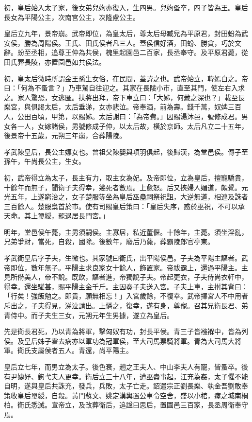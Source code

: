 \begin{pinyinscope}
初，皇后始入太子家，後女弟兒姁亦復入，生四男。兒姁蚤卒，四子皆為王。皇后長女為平陽公主，次南宮公主，次隆慮公主。

皇后立九年，景帝崩。武帝即位，為皇太后，尊太后母臧兒為平原君，封田蚡為武安侯，勝為周陽侯。王氏、田氏侯者凡三人。蓋侯信好酒，田蚡、勝貪，巧於文辭。蚡至丞相，追尊王仲為共侯，槐里起園邑二百家，長丞奉守。及平原君薨，從田氏葬長陵，亦置園邑如共侯法。

初，皇太后微時所謂金王孫生女俗，在民間，蓋諱之也。武帝始立，韓嫣白之。帝曰：「何為不蚤言？」乃車駕自往迎之。其家在長陵小市，直至其門，使左右入求之。家人驚恐，女逃匿。扶將出拜，帝下車立曰：「大姊，何藏之深也？」載至長樂宮，與俱謁太后，太后垂涕，女亦悲泣。帝奉酒，前為壽。錢千萬，奴婢三百人，公田百頃，甲第，以賜姊。太后謝曰：「為帝費。」因賜湯沐邑，號修成君。男女各一人，女嫁諸侯，男號修成子仲，以太后故，橫於京師。太后凡立二十五年，後景帝十五歲，元朔三年崩，合葬陽陵。

孝武陳皇后，長公主嫖女也。曾祖父陳嬰與項羽俱起，後歸漢，為堂邑侯。傳子至孫午，午尚長公主，生女。

初，武帝得立為太子，長主有力，取主女為妃。及帝即位，立為皇后，擅寵驕貴，十餘年而無子，聞衛子夫得幸，幾死者數焉。上愈怒。后又挾婦人媚道，頗覺。元光五年，上遂窮治之，女子楚服等坐為皇后巫蠱祠祭祝詛，大逆無道，相連及誅者三百餘人。楚服梟首於市。使有司賜皇后策曰：「皇后失序，惑於巫祝，不可以承天命。其上璽綬，罷退居長門宮。」

明年，堂邑侯午薨，主男須嗣侯。主寡居，私近董偃。十餘年，主薨。須坐淫亂，兄弟爭財，當死，自殺，國除。後數年，廢后乃薨，葬霸陵郎官亭東。

孝武衛皇后字子夫，生微也。其家號曰衛氏，出平陽侯邑。子夫為平陽主謳者。武帝即位，數年無子。平陽主求良家女十餘人，飾置家。帝祓霸上，還過平陽主。主見所偫美人，帝不說。既飲，謳者進，帝獨說子夫。帝起更衣，子夫侍尚衣軒中，得幸。還坐驩甚，賜平陽主金千斤。主因奏子夫送入宮。子夫上車，主拊其背曰：「行矣！強飯勉之。即貴，願無相忘！」入宮歲餘，不復幸。武帝擇宮人不中用者斥出之，子夫得見，涕泣請出。上憐之，復幸，遂有身，尊寵。召其兄衛長君、弟青侍中。而子夫生三女，元朔元年生男據，遂立為皇后。

先是衛長君死，乃以青為將軍，擊匈奴有功，封長平侯。青三子皆襁褓中，皆為列侯。及皇后姊子霍去病亦以軍功為冠軍侯，至大司馬票騎將軍。青為大司馬大將軍。衛氏支屬侯者五人。青還，尚平陽主。

皇后立七年，而男立為太子。後色衰，趙之王夫人、中山李夫人有寵，皆蚤卒。後有尹婕妤、鉤弋夫人更幸。衛后立三十八年，遭巫蠱事起，江充為姦，太子懼不能自明，遂與皇后共誅充，發兵，兵敗，太子亡走。詔遣宗正劉長樂、執金吾劉敢奉策收皇后璽綬，自殺。黃門蘇文、姚定漢輿置公車令空舍，盛以小棺，瘞之城南桐柏。衛氏悉滅。宣帝立，及改葬衛后，追諡曰思后，置園邑三百家，長丞周衛奉守焉。


\end{pinyinscope}
